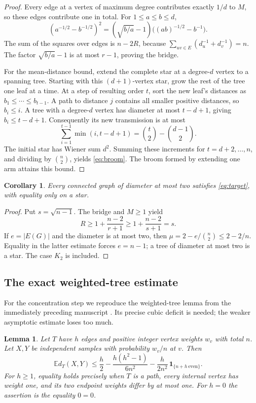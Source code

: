 \documentclass[11pt,a4paper]{article}
\newtheorem{lemma}[theorem]{Lemma}
\newtheorem{corollary}[theorem]{Corollary}
\theoremstyle{remark}\newtheorem{remark}[theorem]{Remark}
\begin{document}
\begin{proof}
Every edge at a vertex of maximum degree contributes exactly $1/d$ to
$M$, so these edges contribute one in total. For $1\le a\le b\le d$,
\[
 (a^{-1/2}-b^{-1/2})^2
 =(\sqrt{b/a}-1)\bigl((ab)^{-1/2}-b^{-1}\bigr).
\]
The sum of the squares over edges is $n-2R$, because
$\sum_{uv\in E}(d_u^{-1}+d_v^{-1})=n$.
The factor $\sqrt{b/a}-1$ is at most $r-1$, proving the bridge.

For the mean-distance bound, extend the complete star at a degree-$d$
vertex to a spanning tree. Starting with this $(d+1)$-vertex star, grow
the rest of the tree one leaf at a time. At a step of resulting order
$t$, sort the new leaf's distances as $b_1\le\cdots\le b_{t-1}$.
A path to distance $j$ contains all smaller positive distances, so
$b_i\le i$. A tree with a degree-$d$ vertex has diameter at most
$t-d+1$, giving $b_i\le t-d+1$. Consequently its new transmission
is at most
\[
 \sum_{i=1}^{t-1}\min(i,t-d+1)
 =\binom t2-\binom{d-1}{2}.
\]
The initial star has Wiener sum $d^2$. Summing these increments for
$t=d+2,\ldots,n$, and dividing by $\binom n2$, yields \eqref{eq:broom}.
The broom formed by extending one arm attains this bound.
\end{proof}

\begin{corollary}\label{cor:diameter-two}
Every connected graph of diameter at most two satisfies \eqref{eq:target},
with equality only on a star.
\end{corollary}
\begin{proof}
Put $s=\sqrt{n-1}$. The bridge and $M\ge1$ yield
\[
 R\ge1+\frac{n-2}{r+1}\ge1+\frac{n-2}{s+1}=s.
\]
If $e=|E(G)|$ and the diameter is at most two, then
$\mu=2-e/\binom n2\le2-2/n$. Equality in the latter estimate forces
$e=n-1$; a tree of diameter at most two is a star. The case $K_2$ is
included.
\end{proof}

\subsection{The exact weighted-tree estimate}

For the concentration step we reproduce the weighted-tree lemma from
the immediately preceding manuscript \cite{transfers}. Its precise cubic
deficit is needed; the weaker asymptotic estimate loses too much.
\begin{lemma}\label{lem:weighted-tree}
Let $T$ have $h$ edges and positive integer vertex weights $w_v$ with total
$n$. Let $X,Y$ be independent samples with probability $w_v/n$ at $v$.
Then
\begin{equation}\label{eq:weighted-tree}
 \mathbb E d_T(X,Y)
 \le \frac h2-\frac{h(h^2-1)}{6n^2}
       -\frac{h}{2n^2}\,\boldsymbol{1}_{\{n+h\ \text{even}\}}.
\end{equation}
For $h\ge1$, equality holds precisely when $T$ is a path, every internal
vertex has weight one, and its two endpoint weights differ by at most one.
For $h=0$ the assertion is the equality $0=0$.
\end{lemma}
\end{document}
